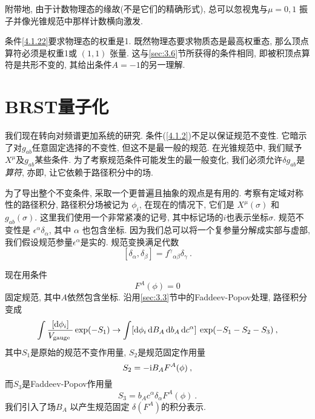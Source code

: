 附带地, 由于计数物理态的缘故(不是它们的精确形式), 总可以忽视鬼与$\mu=0,1$ 振子并像光锥规范中那样计数横向激发.

条件\eqref{4.1.22}要求物理态的权重是1. 既然物理态要求物质态是最高权重态, 那么顶点算符必须是权重1或 $(1,1)$ 张量. 这与\ref{sec:3.6}节所获得的条件相同, 即被积顶点算符是共形不变的, 其给出条件$A=-1$的另一理解.

\newpage

\section{\texorpdfstring{BRST量子化}{4.2 BRST quantization}} \label{sec:4.2}

我们现在转向对频谱更加系统的研究. 条件(\ref{4.1.2})不足以保证规范不变性. 它暗示了对$g_{ab}$任意固定选择的不变性, 但这不是最一般的规范. 在光锥规范中, 我们赋予$X^\mu$及$g_{ab}$某些条件. 为了考察规范条件可能发生的最一般变化, 我们必须允许$\delta g_{ab}$是\emph{算符}, 亦即, 让它依赖于路径积分中的场.

为了导出整个不变条件, 采取一个更普遍且抽象的观点是有用的. 考察有定域对称性的路径积分, 路径积分场被记为 $\phi_{i}$, 在现在的情况下, 它们是 $X^{\mu}(\sigma)$ 和 $g_{a b}(\sigma) $. 这里我们使用一个非常紧凑的记号, 其中标记场的$i$也表示坐标$\sigma $. 规范不变性是 $\epsilon^{\alpha} \delta_{\alpha}$, 其中 $\alpha$ 也包含坐标. 因为我们总可以将一个复参量分解成实部与虚部, 我们假设规范参量$\epsilon^{\alpha}$是实的. 规范变换满足代数
\begin{equation}\label{4.2.1}
[\delta_{\alpha}, \delta_{\beta}]=f^{\gamma}{}_{\alpha \beta} \delta_{\gamma} \:. 
\end{equation}

现在用条件
\begin{equation}
F^{A}(\phi)=0  \label{4.2.2}
\end{equation}
固定规范, 其中$A$依然包含坐标. 沿用\ref{sec:3.3}节中的Faddeev-Popov处理, 路径积分变成
\begin{equation}
\int \frac{[\mathrm{d} \phi_{i}]}{V_{\text {gauge }}} \exp (-S_{1}) \rightarrow \int [\mathrm{d} \phi_{i}\, \mathrm{d} B_{A} \,\mathrm{d} b_{A}\, \mathrm{d} c^{\alpha}] \:
\exp (-S_{1}-S_{2}-S_{3}) \:, \label{4.2.3}
\end{equation}
其中$S_1$是原始的规范不变作用量, $S_2$是规范固定作用量
\begin{equation}
S_{2}=-\mathrm{i} B_{A} F^{A}(\phi) \:, \label{4.2.4}
\end{equation}
而$S_3$是Faddeev-Popov作用量
\begin{equation}
S_{3}=b_{A} c^{\alpha} \delta_{\alpha} F^{A}(\phi) \:. \label{4.2.5}
\end{equation}
我们引入了场$B_A$ 以产生规范固定 $\delta(F^{A})$的积分表示.

